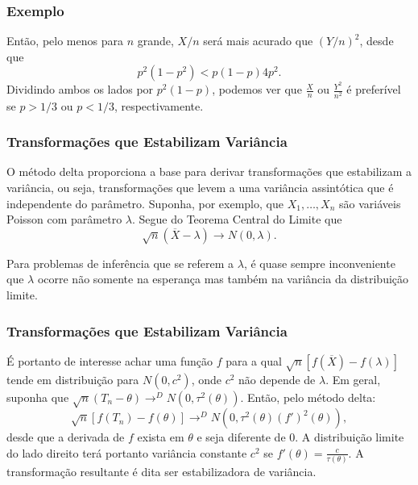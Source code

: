 \begin{frame}
\frametitle{\textbf{Exemplo}}
\baselineskip=13pt
\begin{block}{}


Então, pelo menos para $n$ grande, $X/n$ será mais acurado que
$(Y/n)^2$, desde que
$$p^2(1-p^2)<p(1-p)4p^2.$$
Dividindo ambos os lados por $p^2(1-p)$, podemos ver que
$\frac{X}{n}$ ou $\frac{Y^2}{n^2}$ é preferível se $p>1/3$ ou $p<1/3$, respectivamente.

\end{block}
\end{frame}

\begin{frame}
\frametitle{\textbf{Transformações que Estabilizam Variância}}
\baselineskip=13pt
\begin{block}{}


O método delta proporciona a base para derivar transformações que
estabilizam a variância, ou seja, transformações que levem a uma
variância assintótica que é independente do parâmetro. Suponha, por
exemplo, que $X_1,\ldots,X_n$ são variáveis Poisson com parâmetro
$\lambda$. Segue do Teorema Central do Limite que
$$\sqrt{n}(\overline{X}-\lambda)\rightarrow N(0,\lambda).$$

Para problemas de inferência que se referem a $\lambda$, é quase
sempre inconveniente que $\lambda$ ocorre não somente na esperança
mas também na variância da distribuição limite.

\end{block}
\end{frame}

\begin{frame}
\frametitle{\textbf{Transformações que Estabilizam Variância}}
\baselineskip=13pt
\begin{block}{}


É portanto de
interesse achar uma função $f$ para a qual
$\sqrt{n}[f(\overline{X})-f(\lambda)]$ tende em distribuição para
$N(0,c^2)$, onde $c^2$ não depende de $\lambda$. Em geral, suponha
que $\sqrt{n}(T_n-\theta)\rightarrow^D N(0,\tau^2(\theta))$. Então,
pelo método delta:
$$\sqrt{n}[f(T_n)-f(\theta)]\rightarrow^D N(0,\tau^2(\theta)(f')^2(\theta)),$$
desde que a derivada de $f$ exista em $\theta$ e seja diferente de
$0$. A distribuição limite do lado direito terá portanto variância
constante $c^2$ se $f'(\theta)=\frac{c}{\tau(\theta)}$. A
transformação resultante é dita ser estabilizadora de variância.

\end{block}
\end{frame}

